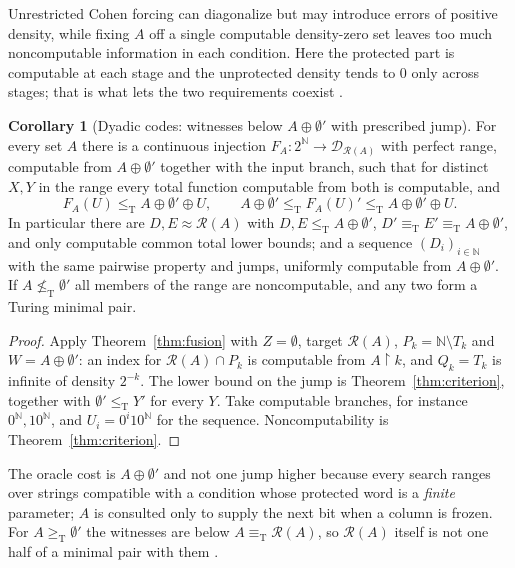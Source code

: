 \documentclass[11pt,letterpaper]{article}
\theoremstyle{definition}
\newtheorem{corollary}[definition]{Corollary}
\numberwithin{equation}{section}
\newcommand{\N}{\mathbb N}
\newcommand{\Cantor}{2^{\N}}
\newcommand{\leT}{\le_{\mathrm T}}
\newcommand{\geT}{\ge_{\mathrm T}}
\newcommand{\eqT}{\equiv_{\mathrm T}}
\newcommand{\nleT}{\nleq_{\mathrm T}}
\newcommand{\DX}[1]{\mathcal D_{#1}}
\newcommand{\Rc}{\mathcal R}
\newcommand{\rest}{\mathbin{\upharpoonright}}
\newcommand{\src}[1]{\leavevmode{\sffamily\footnotesize\color{Steel}[#1]}}
\begin{document}
Unrestricted Cohen forcing can diagonalize but may introduce errors of positive density, while fixing $A$ off a single computable density-zero set leaves too much noncomputable information in each condition. Here the protected part is computable at each stage and the unprotected density tends to $0$ only across stages; that is what lets the two requirements coexist \src{R5}.

\begin{corollary}[Dyadic codes: witnesses below $A\oplus\emptyset'$ with prescribed jump]\label{cor:columnfusion}\src{R3, R4}
For every set $A$ there is a continuous injection $F_A:\Cantor\to\DX{\Rc(A)}$ with perfect range, computable from $A\oplus\emptyset'$ together with the input branch, such that for distinct $X,Y$ in the range every total function computable from both is computable, and
\[
 F_A(U)\leT A\oplus\emptyset'\oplus U,\qquad A\oplus\emptyset'\leT F_A(U)'\leT A\oplus\emptyset'\oplus U .
\]
In particular there are $D,E\approx\Rc(A)$ with $D,E\leT A\oplus\emptyset'$, $D'\eqT E'\eqT A\oplus\emptyset'$, and only computable common total lower bounds; and a sequence $(D_i)_{i\in\N}$ with the same pairwise property and jumps, uniformly computable from $A\oplus\emptyset'$. If $A\nleT\emptyset'$ all members of the range are noncomputable, and any two form a Turing minimal pair.
\end{corollary}
\begin{proof}
Apply Theorem~\ref{thm:fusion} with $Z=\emptyset$, target $\Rc(A)$, $P_k=\N\setminus T_k$ and $W=A\oplus\emptyset'$: an index for $\Rc(A)\cap P_k$ is computable from $A\rest k$, and $Q_k=T_k$ is infinite of density $2^{-k}$. The lower bound on the jump is Theorem~\ref{thm:criterion}, together with $\emptyset'\leT Y'$ for every $Y$. Take computable branches, for instance $0^\N,10^\N$, and $U_i=0^i10^\N$ for the sequence. Noncomputability is Theorem~\ref{thm:criterion}.
\end{proof}
The oracle cost is $A\oplus\emptyset'$ and not one jump higher because every search ranges over strings compatible with a condition whose protected word is a \emph{finite} parameter; $A$ is consulted only to supply the next bit when a column is frozen. For $A\geT\emptyset'$ the witnesses are below $A\eqT\Rc(A)$, so $\Rc(A)$ itself is not one half of a minimal pair with them \src{R4}.
\end{document}
